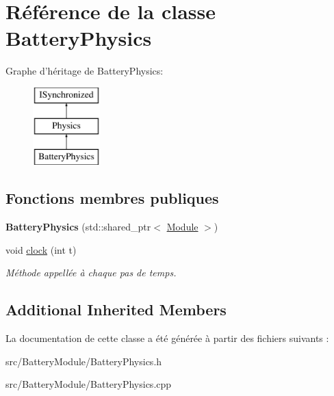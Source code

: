 \hypertarget{classBatteryPhysics}{\section{Référence de la classe Battery\-Physics}
\label{classBatteryPhysics}
}
Graphe d'héritage de Battery\-Physics\-:\begin{figure}[H]
\begin{center}
\leavevmode
\includegraphics[height=3.000000cm]{classBatteryPhysics}
\end{center}
\end{figure}
\subsection*{Fonctions membres publiques}
\begin{DoxyCompactItemize}
\item 
\hypertarget{classBatteryPhysics_ac6fa6a615d95447a246d8f0dc01e7b02}{{\bfseries Battery\-Physics} (std\-::shared\-\_\-ptr$<$ \hyperlink{classModule}{Module} $>$)}\label{classBatteryPhysics_ac6fa6a615d95447a246d8f0dc01e7b02}

\item 
\hypertarget{classBatteryPhysics_a3651cc1fbb0d314a03d25af655804acc}{void \hyperlink{classBatteryPhysics_a3651cc1fbb0d314a03d25af655804acc}{clock} (int t)}\label{classBatteryPhysics_a3651cc1fbb0d314a03d25af655804acc}

\begin{DoxyCompactList}\small\item\em Méthode appellée à chaque pas de temps. \end{DoxyCompactList}\end{DoxyCompactItemize}
\subsection*{Additional Inherited Members}


La documentation de cette classe a été générée à partir des fichiers suivants \-:\begin{DoxyCompactItemize}
\item 
src/\-Battery\-Module/Battery\-Physics.\-h\item 
src/\-Battery\-Module/Battery\-Physics.\-cpp\end{DoxyCompactItemize}
